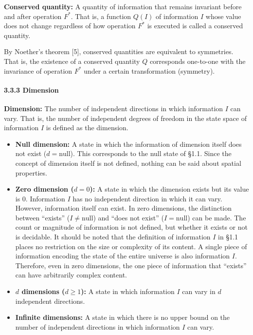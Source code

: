 \documentclass[a4paper,11pt]{article}
\providecommand{\tightlist}{\setlength{\itemsep}{0pt}\setlength{\parskip}{0pt}}
\begin{document}
\textbf{Conserved quantity:} A quantity of information that remains
invariant before and after operation \(F^*\). That is, a function
\(Q(I)\) of information \(I\) whose value does not change regardless of
how operation \(F^*\) is executed is called a conserved quantity.

By Noether's theorem {[}5{]}, conserved quantities are equivalent to
symmetries. That is, the existence of a conserved quantity \(Q\)
corresponds one-to-one with the invariance of operation \(F^*\) under a
certain transformation (symmetry).

\paragraph{3.3.3 Dimension}\label{dimension}

\textbf{Dimension:} The number of independent directions in which
information \(I\) can vary. That is, the number of independent degrees
of freedom in the state space of information \(I\) is defined as the
dimension.

\begin{itemize}
\tightlist
\item
  \textbf{Null dimension:} A state in which the information of dimension
  itself does not exist (\(d = \mathrm{null}\)). This corresponds to the
  null state of §1.1. Since the concept of dimension itself is not
  defined, nothing can be said about spatial properties.
\item
  \textbf{Zero dimension (\(d = 0\)):} A state in which the dimension
  exists but its value is 0. Information \(I\) has no independent
  direction in which it can vary. However, information itself can exist.
  In zero dimensions, the distinction between ``exists''
  (\(I \neq \mathrm{null}\)) and ``does not exist''
  (\(I = \mathrm{null}\)) can be made. The count or magnitude of
  information is not defined, but whether it exists or not is decidable.
  It should be noted that the definition of information \(I\) in §1.1
  places no restriction on the size or complexity of its content. A
  single piece of information encoding the state of the entire universe
  is also information \(I\). Therefore, even in zero dimensions, the one
  piece of information that ``exists'' can have arbitrarily complex
  content.
\item
  \textbf{\(d\) dimensions (\(d \geq 1\)):} A state in which information
  \(I\) can vary in \(d\) independent directions.
\item
  \textbf{Infinite dimensions:} A state in which there is no upper bound
  on the number of independent directions in which information \(I\) can
  vary.
\end{itemize}
\end{document}
